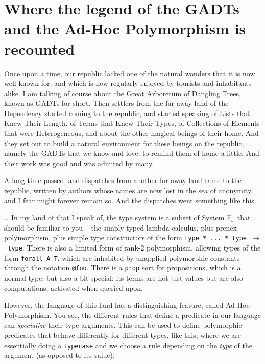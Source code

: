 \section{Where the legend of the GADTs and the Ad-Hoc Polymorphism is
recounted}\label{where-the-legend-of-the-gadts-and-the-ad-hoc-polymorphism-is-recounted}

\identNormal\it

Once upon a time, our republic lacked one of the natural wonders that it
is now well-known for, and which is now regularly enjoyed by tourists
and inhabitants alike. I am talking of course about the Great Arboretum
of Dangling Trees, known as GADTs for short. Then settlers from the
far-away land of the Dependency started coming to the republic, and
started speaking of Lists that Knew Their Length, of Terms that Knew
Their Types, of Collections of Elements that were Heterogeneous, and
about the other magical beings of their home. And they set out to build
a natural environment for these beings on the republic, namely the GADTs
that we know and love, to remind them of home a little. And their work
was good and was admired by many.

A long time passed, and dispatches from another far-away land came to
the republic, written by authors whose names are now lost in the sea of
anonymity, and I fear might forever remain so. And the dispatches went
something like this.

\rm

\heroAUTHOR{} \ldots{} In my land of \lamprolog that I speak of, the type
system is a subset of System F\(_\omega\) that should be familiar to you
-- the simply typed lambda calculus, plus prenex polymorphism, plus
simple type constructors of the form
\texttt{type\ *\ ...\ *\ type\ \ensuremath{\to}\ type}. There is also a
limited form of rank-2 polymorphism, allowing types of the form
\texttt{forall\ A\ T}, which are inhabited by unapplied polymorphic
constants through the notation \texttt{@foo}. There is a \texttt{prop}
sort for propositions, which is a normal type, but also a bit special:
its terms are not just values but are also computations, activated when
queried upon.

However, the language of this land has a distinguishing feature, called
Ad-Hoc Polymorphism. You see, the different rules that define a
predicate in our language can \emph{specialize} their type arguments.
This can be used to define polymorphic predicates that behave
differently for different types, like this, where we are essentially
doing a \texttt{typecase} and we choose a rule depending on the
\emph{type} of the argument (as opposed to its value):


